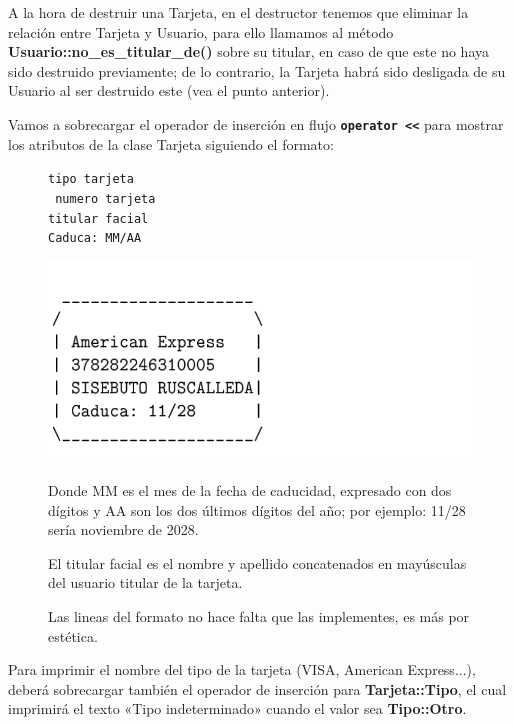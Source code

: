 A la hora de destruir una Tarjeta, en el destructor tenemos que eliminar la relación entre Tarjeta y Usuario, para ello llamamos al método \textbf{Usuario::no\_es\_titular\_de()} sobre su titular, en caso de que este no haya sido destruido previamente; de lo contrario, la Tarjeta habrá sido desligada de su Usuario al ser destruido este (vea el punto anterior).

Vamos a sobrecargar el operador de inserción en flujo \texttt{\textbf{operator <<}} para mostrar los atributos de la clase Tarjeta siguiendo el formato:

\begin{figure}[h]
    \begin{minipage}{0.4\textwidth}
            \texttt{tipo tarjeta}\\
            \texttt{ numero tarjeta}\\
            \texttt{titular facial}\\
            \texttt{Caduca: MM/AA}
    \end{minipage}
    \hfill
    \begin{minipage}{0.5\textwidth}
        \includegraphics[width=\textwidth]{Pics/P2_2.png}
    \end{minipage}
    Donde MM es el mes de la fecha de caducidad, expresado con dos dígitos y AA son los dos últimos dígitos del año; por ejemplo: 11/28 sería noviembre de 2028.
    
    El titular facial es el nombre y apellido concatenados en mayúsculas del usuario titular de la tarjeta.

    Las lineas del formato no hace falta que las implementes, es más por estética.
\end{figure}
Para imprimir el nombre del tipo de la tarjeta (VISA, American Express...), deberá
sobrecargar también el operador de inserción para \textbf{Tarjeta::Tipo}, el cual imprimirá el texto «Tipo indeterminado» cuando el valor sea \textbf{Tipo::Otro}.

